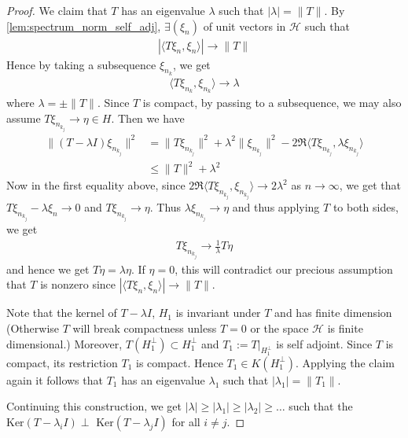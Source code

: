 \begin{proof}
  We claim that $T$ has an eigenvalue $\lambda$ such that $|\lambda|
  = \|T\|$. By   \autoref{lem:spectrum_norm_self_adj}, $\exists
  (\xi_n)$ of unit vectors in $\mathcal{H}$ such that
  \begin{align*}
    |\langle T  \xi_n , \xi_n \rangle| \to \|T\|
  \end{align*}
  Hence by taking a subsequence $\xi_{n_k}$, we get
  \begin{align*}
    \langle T \xi_{n_k} ,  \xi_{n_k} \rangle \to \lambda
  \end{align*}
  where $\lambda = \pm \|T\|$. Since $T$ is compact, by passing to a
  subsequence, we may also assume $T \xi_{n_{k_j}} \to \eta \in H$.
  Then we have
  \begin{align*}
    \|(T - \lambda I)\xi_{n_{k_j}}\|^2 &= \|T \xi_{n_{k_j}}\|^2 +
    \lambda^2 \|\xi_{n_{k_j}}\|^2 - 2 \Re \langle T \xi_{n_{k_j}}
    , \lambda \xi_{n_{k_j}}  \rangle  \\
    & \le \|T\|^2 + \lambda^2
  \end{align*}
  Now in the first equality above, since $2 \Re \langle T \xi_{n_{k_j}}
  ,\xi_{n_{k_j}}  \rangle \to 2\lambda^2$ as $n \to \infty$, we get
  that $T \xi_{n_{k_j}} - \lambda\xi_n \to 0$ and $T \xi_{n_{k_j}}
  \to \eta$. Thus $\lambda \xi_{n_{k_j}} \to \eta$ and thus applying
  $T$ to both sides, we get
  \begin{align*}
    T \xi_{n_{k_j}} \to \frac{1}{\lambda} T \eta
  \end{align*}
  and hence we get $T \eta = \lambda \eta$. If $\eta= 0$, this will
  contradict our precious assumption that $T$ is nonzero since
  $|\langle T \xi_n , \xi_n \rangle | \to \|T\|$.

  Note that the kernel of $T - \lambda I$, $H_1$ is invariant under
  $T$ and has finite dimension (Otherwise $T$ will break compactness
  unless $T = 0$ or the space $\mathcal{H}$ is finite dimensional.)
  Moreover, $T(H_1^\perp) \subset H_1^\perp$ and $T_1 := T|_{H_1^\perp}$ is
  self adjoint. Since $T$ is compact, its restriction $T_1$ is
  compact. Hence $T_1 \in K(H_1^\perp)$. Applying the claim again it
  follows that $T_1$ has an eigenvalue $\lambda_1$ such that
  $|\lambda_1| = \|T_1\|$.

  Continuing this construction, we get $|\lambda| \ge |\lambda_1| \ge
  |\lambda_2| \ge \ldots$ such that the $\textrm{Ker}(T - \lambda_iI)
  \perp \textrm{ Ker}(T - \lambda_j I)$ for all $i \neq j$.


\end{proof}

